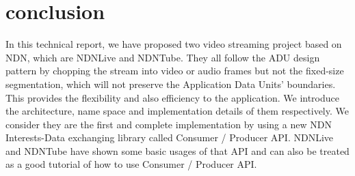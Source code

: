 \section{conclusion} %
\label{sec:conclusion}
In this technical report, we have proposed two video streaming project based on NDN, which are NDNLive and NDNTube. They all follow the ADU design pattern by chopping the stream into video or audio frames but not the fixed-size segmentation, which will not preserve the Application Data Units' boundaries. This provides the flexibility and also efficiency to the application. We introduce the architecture, name space and implementation details of them respectively. We consider they are the first and complete implementation by using a new NDN Interests-Data exchanging library called Consumer / Producer API. NDNLive and NDNTube have shown some basic usages of that API and can also be treated as a good tutorial of how to use Consumer / Producer API.
